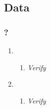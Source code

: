 \subsection{Data}
\label{sec:data_spec}

\subsubsection{?}
	\begin{enumerate}

		\item 
		\begin{enumerate}
			\item \textit{ Verify }
		\end{enumerate}

		\item
		\begin{enumerate}
			\item \textit{ Verify }
		\end{enumerate}


	\end{enumerate}
